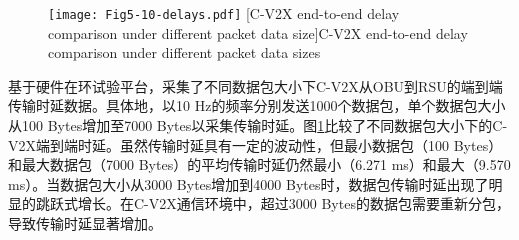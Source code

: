 \begin{figure}[h]
\centering
  \texttt{[image: Fig5-10-delays.pdf]}
  [C-V2X end-to-end delay comparison under different packet data size]{C-V2X end-to-end delay comparison under different packet data sizes}
  \label{fig 5-9}
\end{figure}

基于硬件在环试验平台，采集了不同数据包大小下C-V2X从OBU到RSU的端到端传输时延数据。具体地，以10 Hz的频率分别发送1000个数据包，单个数据包大小从100 Bytes增加至7000 Bytes以采集传输时延。图\ref{fig 5-9}比较了不同数据包大小下的C-V2X端到端时延。虽然传输时延具有一定的波动性，但最小数据包（100 Bytes）和最大数据包（7000 Bytes）的平均传输时延仍然最小（6.271 ms）和最大（9.570 ms）。当数据包大小从3000 Bytes增加到4000 Bytes时，数据包传输时延出现了明显的跳跃式增长。在C-V2X通信环境中，超过3000 Bytes的数据包需要重新分包，导致传输时延显著增加。

